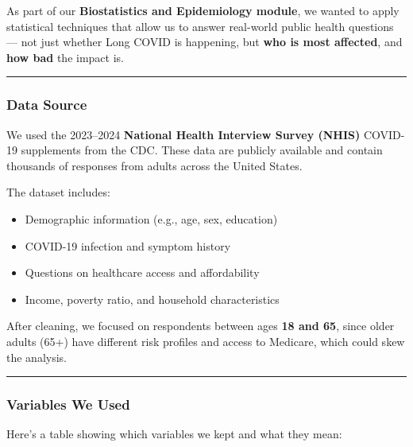 \documentclass[
]{article}
\providecommand{\tightlist}{%
  \setlength{\itemsep}{0pt}\setlength{\parskip}{0pt}}
\begin{document}
As part of our \textbf{Biostatistics and Epidemiology module}, we wanted
to apply statistical techniques that allow us to answer real-world
public health questions --- not just whether Long COVID is happening,
but \textbf{who is most affected}, and \textbf{how bad} the impact is.

\begin{center}\rule{0.5\linewidth}{0.5pt}\end{center}

\subsubsection{Data Source}\label{data-source}

We used the 2023--2024 \textbf{National Health Interview Survey (NHIS)}
COVID-19 supplements from the CDC. These data are publicly available and
contain thousands of responses from adults across the United States.

The dataset includes:

\begin{itemize}
\tightlist
\item
  Demographic information (e.g., age, sex, education)
\item
  COVID-19 infection and symptom history
\item
  Questions on healthcare access and affordability
\item
  Income, poverty ratio, and household characteristics
\end{itemize}

After cleaning, we focused on respondents between ages \textbf{18 and
65}, since older adults (65+) have different risk profiles and access to
Medicare, which could skew the analysis.

\begin{center}\rule{0.5\linewidth}{0.5pt}\end{center}

\subsubsection{Variables We Used}\label{variables-we-used}

Here's a table showing which variables we kept and what they mean:
\end{document}
